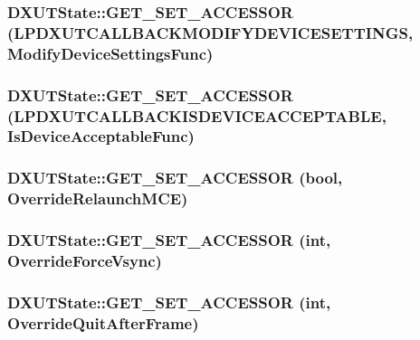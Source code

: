 \label{class_d_x_u_t_state_a28ff6aa907bdf2d644e716809d675e3d}
\hypertarget{class_d_x_u_t_state_ac0eb469750e15272e744bd9e558254f1}{
\subsubsection[{GET\_\-SET\_\-ACCESSOR}]{\setlength{\rightskip}{0pt plus 5cm}DXUTState::GET\_\-SET\_\-ACCESSOR ({\bf LPDXUTCALLBACKMODIFYDEVICESETTINGS}, \/  ModifyDeviceSettingsFunc)}}
\label{class_d_x_u_t_state_ac0eb469750e15272e744bd9e558254f1}
\hypertarget{class_d_x_u_t_state_ab51907217fb6cb6913a5a61938a7057a}{
\subsubsection[{GET\_\-SET\_\-ACCESSOR}]{\setlength{\rightskip}{0pt plus 5cm}DXUTState::GET\_\-SET\_\-ACCESSOR ({\bf LPDXUTCALLBACKISDEVICEACCEPTABLE}, \/  IsDeviceAcceptableFunc)}}
\label{class_d_x_u_t_state_ab51907217fb6cb6913a5a61938a7057a}
\hypertarget{class_d_x_u_t_state_a7a41aa4832e7af0cc22e3a5e2c91c1ae}{
\subsubsection[{GET\_\-SET\_\-ACCESSOR}]{\setlength{\rightskip}{0pt plus 5cm}DXUTState::GET\_\-SET\_\-ACCESSOR (bool, \/  OverrideRelaunchMCE)}}
\label{class_d_x_u_t_state_a7a41aa4832e7af0cc22e3a5e2c91c1ae}
\hypertarget{class_d_x_u_t_state_a54cd9b06bcaae901e3acdb1c3b70df3a}{
\subsubsection[{GET\_\-SET\_\-ACCESSOR}]{\setlength{\rightskip}{0pt plus 5cm}DXUTState::GET\_\-SET\_\-ACCESSOR ({\bf int}, \/  OverrideForceVsync)}}
\label{class_d_x_u_t_state_a54cd9b06bcaae901e3acdb1c3b70df3a}
\hypertarget{class_d_x_u_t_state_afac280cfbacc515dbdea3e987bfd50a6}{
\subsubsection[{GET\_\-SET\_\-ACCESSOR}]{\setlength{\rightskip}{0pt plus 5cm}DXUTState::GET\_\-SET\_\-ACCESSOR ({\bf int}, \/  OverrideQuitAfterFrame)}}
